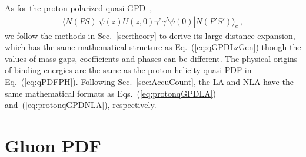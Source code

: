 \documentclass[a4paper,11pt]{article}
\begin{document}
As for the proton polarized quasi-GPD~\cite{Ji:2015qla,Bhattacharya:2023jsc},
\begin{align}
\langle N(P S)| \bar{\psi}(z) U(z,0) \gamma^z \gamma^5 \psi(0) | N(P' S')\rangle_c \ ,    
\end{align}
we follow the methods in Sec.~\ref{sec:theory} to derive its large distance expansion, which has the same mathematical structure as Eq.~(\ref{eq:qGPDLzGen}) though the values of mass gaps, coefficients and phases can be different. The physical origins of binding energies are the same as the proton helicity quasi-PDF in Eq.~(\ref{eq:qPDFPH}). Following Sec.~\ref{sec:AccuCount}, the LA and NLA have the same mathematical formats as Eqs.~(\ref{eq:protonqGPDLA}) and~(\ref{eq:protonqGPDNLA}), respectively.



\section{Gluon PDF}\label{sec:Gluon}

\end{document}
